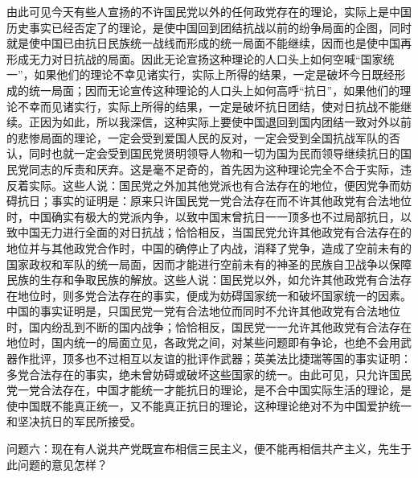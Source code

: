 由此可见今天有些人宣扬的不许国民党以外的任何政党存在的理论，实际上是中国历史事实已经否定了的理论，是使中国回到团结抗战以前的纷争局面的企图，同时就是使中国已由抗日民族统一战线而形成的统一局面不能继续，因而也是使中国再形成无力对日抗战的局面。因此无论宣扬这种理论的人口头上如何空喊“国家统一”，如果他们的理论不幸见诸实行，实际上所得的结果，一定是破坏今日既经形成的统一局面；因而无论宣传这种理论的人口头上如何高呼“抗日”，如果他们的理论不幸而见诸实行，实际上所得的结果，一定是破坏抗日团结，使对日抗战不能继续。正因为如此，所以我深信，这种实际上要使中国退回到国内团结一致对外以前的悲惨局面的理论，一定会受到爱国人民的反对，一定会受到全国抗战军队的否认，同时也就一定会受到国民党贤明领导人物和一切为国为民而领导继续抗日的国民党同志的斥责和厌弃。这是毫不足奇的，首先因为这种理论完全不合于实际，违反着实际。这些人说：国民党之外加其他党派也有合法存在的地位，便因党争而妨碍抗日；事实的证明是：原来只许国民党一党合法存在而不许其他政党有合法地位时，中国确实有极大的党派内争，以致中国末曾抗日一一顶多也不过局部抗日，以致中国无力进行全面的对日抗战；恰恰相反，当国民党允许其他政党有合法存在的地位并与其他政党合作时，中国的确停止了内战，消释了党争，造成了空前未有的国家政权和军队的统一局面，因而才能进行空前未有的神圣的民族自卫战争以保障民族的生存和争取民族的解放。这些人说：国民党以外，如允许其他政党有合法存在地位时，则多党合法存在的事实，便成为妨碍国家统一和破坏国家统一的因素。中国的事实证明是，只国民党一党有合法地位而同时不允许其他政党有合法地位时，国内纷乱到不断的国内战争；恰恰相反，国民党一一允许其他政党有合法存在地位时，国内统一的局面立见，各政党之间，对某些问题即有争论，也绝不会用武器作批评，顶多也不过相互以友谊的批评作武器；英美法比捷瑞等国的事实证明：多党合法存在的事实，绝未曾妨碍或破坏这些国家的统一。由此可见，只允许国民党一党合法存在，中国才能统一才能抗日的理论，是不合中国实际生活的理论，是使中国既不能真正统一，又不能真正抗日的理论，这种理论绝对不为中国爱护统一和坚决抗日的军民所接受。

问题六：现在有人说共产党既宣布相信三民主义，便不能再相信共产主义，先生于此问题的意见怎样？

